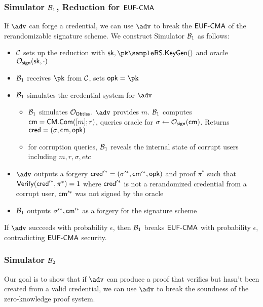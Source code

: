 \subsubsection{Simulator $\mathcal{B}_1$, Reduction for $\mathsf{EUF\text{-}CMA}$}
If $\adv$ can forge a credential, we can use $\adv$ to break the $\mathsf{EUF\text{-}CMA}$ of the rerandomizable signature scheme.
We construct Simulator $\mathcal{B}_1$ as follows:
\begin{itemize}
    \item $\mathcal{C}$ sets up the reduction with $\sk, \pk \sample \RSKeyGen()$ and oracle $\mathcal{O}_{\mathsf{sign}}(\mathsf{sk}, \cdot)$
    \item $\mathcal{B}_1$ receives $\pk$ from $\mathcal{C}$, sets $\opk = \pk$
    \item $\mathcal{B}_1$ simulates the credential system for $\adv$
    \begin{itemize}
        \item $\mathcal{B}_1$ simulates $\mathcal{O}_{\mathsf{ObtIss}}$. $\adv$ provides $m$. $\mathcal{B}_1$ computes $\mathsf{cm} = \mathsf{CM.Com}([m];r)$, queries oracle for $\sigma \gets \mathcal{O}_{\mathsf{sign}}(\mathsf{cm})$. Returns $\mathsf{cred} = (\sigma, \mathsf{cm}, \mathsf{opk})$
        \item for corruption queries, $\mathcal{B}_1$ reveals the internal state of corrupt users including $m, r, \sigma, etc$
    \end{itemize}
    \item $\adv$ outputs a forgery $\mathsf{cred}'^* = (\sigma'^*, \mathsf{cm}'^*, \mathsf{opk} )$ and proof $\pi^*$ such that $\mathsf{Verify}(\mathsf{cred}'^*, \pi^*) = 1$ where $\mathsf{cred}'^*$ is not a rerandomized credential from a corrupt user, $\mathsf{cm}'^*$ was not signed by the oracle
    \item $\mathcal{B}_1$ outputs $\sigma'^*, \mathsf{cm}'^*$ as a forgery for the signature scheme
\end{itemize}
If $\adv$ succeeds with probability $\epsilon$, then $\mathcal{B}_1$ breaks $\mathsf{EUF\text{-}CMA}$ with probability $\epsilon$, contradicting $\mathsf{EUF\text{-}CMA}$ security.


\subsubsection{Simulator $\mathcal{B}_2$}

Our goal is to show that if $\adv$ can produce a proof that verifies but hasn't been created from a valid credential, we can use $\adv$ to break the soundness of the zero-knowledge proof system.

